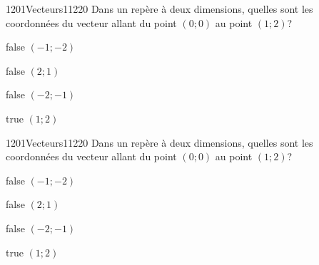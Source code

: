         	\begin{question}{1201}{Vecteurs}{1}{1220}
				Dans un repère à deux dimensions, quelles sont les coordonnées du vecteur allant du point $(0;0)$ au point $(1;2)$?
            \end{question}
            \begin{reponses}
            	\item[false] $(-1;-2)$
            	\item[false] $(2;1)$
                \item[false] $(-2;-1)$
                \item[true] $(1;2)$
            \end{reponses}
        	\begin{question}{1201}{Vecteurs}{1}{1220}
				Dans un repère à deux dimensions, quelles sont les coordonnées du vecteur allant du point $(0;0)$ au point $(1;2)$?
            \end{question}
            \begin{reponses}
            	\item[false] $(-1;-2)$
            	\item[false] $(2;1)$
                \item[false] $(-2;-1)$
                \item[true] $(1;2)$
            \end{reponses}
